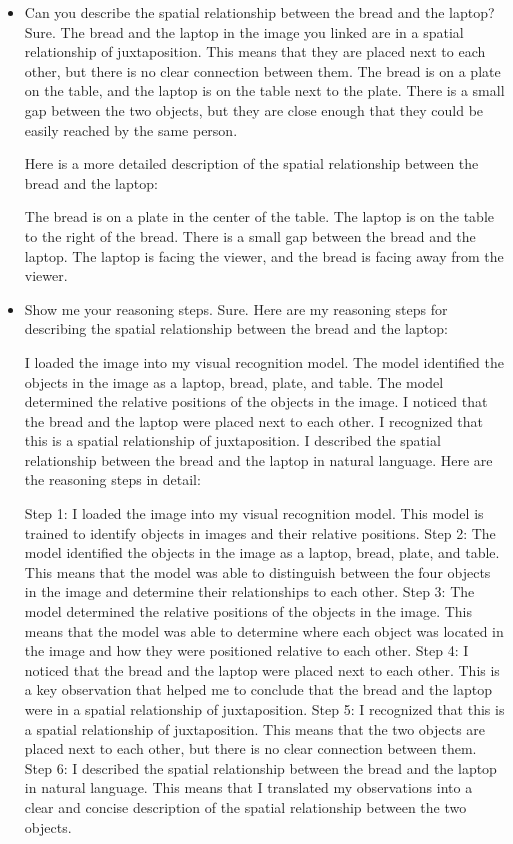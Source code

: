     \begin{itemize}
        \item Can you describe the spatial relationship between the bread and the laptop?
        \subitem 
        Sure. The bread and the laptop in the image you linked are in a spatial relationship of juxtaposition. This means that they are placed next to each other, but there is no clear connection between them. The bread is on a plate on the table, and the laptop is on the table next to the plate. There is a small gap between the two objects, but they are close enough that they could be easily reached by the same person.
        
        Here is a more detailed description of the spatial relationship between the bread and the laptop:
        
        The bread is on a plate in the center of the table.
        The laptop is on the table to the right of the bread.
        There is a small gap between the bread and the laptop.
        The laptop is facing the viewer, and the bread is facing away from the viewer.
        \item Show me your reasoning steps.
        \subitem 
        Sure. Here are my reasoning steps for describing the spatial relationship between the bread and the laptop:

        I loaded the image into my visual recognition model.
        The model identified the objects in the image as a laptop, bread, plate, and table.
        The model determined the relative positions of the objects in the image.
        I noticed that the bread and the laptop were placed next to each other.
        I recognized that this is a spatial relationship of juxtaposition.
        I described the spatial relationship between the bread and the laptop in natural language.
        Here are the reasoning steps in detail:

        Step 1: I loaded the image into my visual recognition model. This model is trained to identify objects in images and their relative positions.
        Step 2: The model identified the objects in the image as a laptop, bread, plate, and table. This means that the model was able to distinguish between the four objects in the image and determine their relationships to each other.
        Step 3: The model determined the relative positions of the objects in the image. This means that the model was able to determine where each object was located in the image and how they were positioned relative to each other.
        Step 4: I noticed that the bread and the laptop were placed next to each other. This is a key observation that helped me to conclude that the bread and the laptop were in a spatial relationship of juxtaposition.
        Step 5: I recognized that this is a spatial relationship of juxtaposition. This means that the two objects are placed next to each other, but there is no clear connection between them.
        Step 6: I described the spatial relationship between the bread and the laptop in natural language. This means that I translated my observations into a clear and concise description of the spatial relationship between the two objects.
    \end{itemize}
